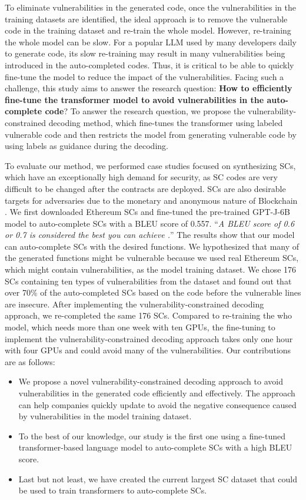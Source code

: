 \documentclass[12pt]{book}
\begin{document}
To eliminate vulnerabilities in the generated code, once the vulnerabilities in the training datasets are identified, the ideal approach is to remove the vulnerable code in the training dataset and re-train the whole model. However, re-training the whole model can be slow. For a popular LLM used by many developers daily to generate code, its slow re-training may result in many vulnerabilities being introduced in the auto-completed codes. Thus, it is critical to be able to quickly fine-tune the model to reduce the impact of the vulnerabilities. Facing such a challenge, this study aims to answer the research question: \textbf{How to efficiently fine-tune the transformer model to avoid vulnerabilities in the auto-complete code}? To answer the research question, we propose the vulnerability-constrained decoding method, which fine-tunes the transformer using labeled vulnerable code and then restricts the model from generating vulnerable code by using labels as guidance during the decoding.

To evaluate our method, we performed case studies focused on synthesizing SCs, which have an exceptionally high demand for security, as SC codes are very difficult to be changed after the contracts are deployed. SCs are also desirable targets for adversaries due to the monetary and anonymous nature of Blockchain \cite{atzei2017survey}. We first downloaded Ethereum SCs and fine-tuned the pre-trained GPT-J-6B model \cite{gpt-j} to auto-complete SCs with a BLEU score of 0.557. ``\textit{A BLEU score of 0.6 or 0.7 is considered the best you can achieve \cite{Bleuscore}.}'' The results show that our model can auto-complete SCs with the desired functions. We hypothesized that many of the generated functions might be vulnerable because we used real Ethereum SCs, which might contain vulnerabilities, as the model training dataset. We chose 176 SCs containing ten types of vulnerabilities from the \cite{Hu2023} dataset and found out that over 70\% of the auto-completed SCs based on the code before the vulnerable lines are insecure. After implementing the vulnerability-constrained decoding approach, we re-completed the same 176 SCs. Compared to re-training the who model, which needs more than one week with ten GPUs, the fine-tuning to implement the vulnerability-constrained decoding approach takes only one hour with four GPUs and could avoid many of the vulnerabilities. Our contributions are as follows:
\begin{itemize}
    \item We propose a novel vulnerability-constrained decoding approach to avoid vulnerabilities in the generated code efficiently and effectively. The approach can help companies quickly update  to avoid the negative consequence caused by vulnerabilities in the model training dataset. 
    \item To the best of our knowledge, our study is the first one using a fine-tuned transformer-based language model to auto-complete SCs with a high BLEU score.
    \item Last but not least, we have created the current largest SC dataset that could be used to train transformers to auto-complete SCs.
 

\end{itemize}
\end{document}
